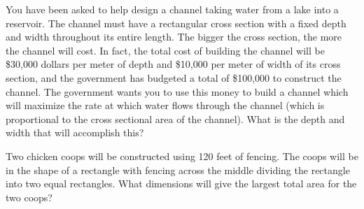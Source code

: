 \begin{problem}
\item You have been asked to help design a channel taking water from a
  lake into a reservoir.  The channel must have a rectangular cross
  section with a fixed depth and width throughout its entire length.
  The bigger the cross section, the more the channel will cost.  In
  fact, the total cost of building the channel will be \$30,000
  dollars per meter of depth and \$10,000 per meter of width of its
  cross section, and the government has budgeted a total of \$100,000
  to construct the channel.  The government wants you to use this
  money to build a channel which will maximize the rate at which water
  flows through the channel (which is proportional to the cross
  sectional area of the channel).  What is the depth and width that
  will accomplish this?

\item Two chicken coops will be constructed using 120 feet of
  fencing. The coops will be in the shape of a rectangle with fencing
  across the middle dividing the rectangle into two equal
  rectangles. What dimensions will give the largest total area for the
  two coops?

\end{problem}


